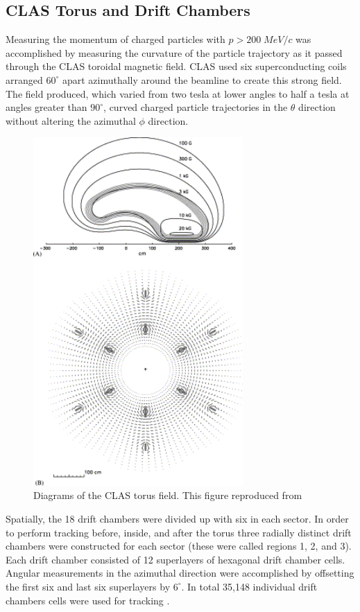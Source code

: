 \subsection{CLAS Torus and Drift Chambers}
Measuring the momentum of charged particles with $p > 200 \; MeV/c$ was accomplished by measuring the curvature of the particle trajectory as it passed through the CLAS toroidal magnetic field.  CLAS used six superconducting coils arranged $60^\circ$ apart azimuthally around the beamline to create this strong field.  The field produced, which varied from two tesla at lower angles to half a tesla at angles greater than $90^\circ$, curved charged particle trajectories in the $\theta$ direction without altering the azimuthal $\phi$ direction.\\

\begin{figure}
	\centering
		\includegraphics[width=8cm]{image/diagrams/torus-field.png}
		\caption{Diagrams of the CLAS torus field.  This figure reproduced from \cite{hardware-adams:2001}}
\end{figure}

Spatially, the 18 drift chambers were divided up with six in each sector.  In order to perform tracking before, inside, and after the torus three radially distinct drift chambers were constructed for each sector (these were called regions 1, 2, and 3).  Each drift chamber consisted of 12 superlayers of hexagonal drift chamber cells.  Angular measurements in the azimuthal direction were accomplished by offsetting the first six and last six superlayers by $6^\circ$.  In total 35,148 individual drift chambers cells were used for tracking \cite{hardware-mestayer:2000}.

